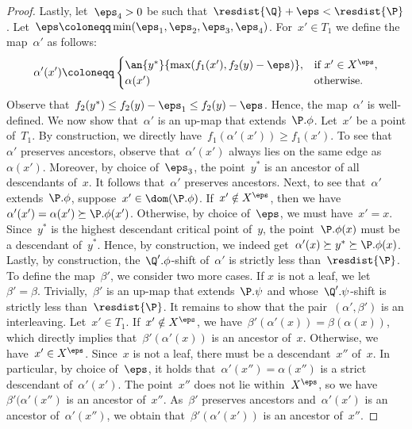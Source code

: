 \begin{proof}
    Lastly, let~$\eps_4 > 0$ be such that~$\resdist{\Q} + \eps < \resdist{\P}$.
    Let~$\eps \coloneqq \min(\eps_1, \eps_2, \eps_3, \eps_4)$.
    For~$x' \in T_1$ we define the map~$\alpha'$ as follows:
    \[
        \alpha'(x') \coloneqq \begin{cases}
            \an{y^*}{\max(f_1(x'), f_2(y)-\eps)}, & \text{if } x' \in X^\eps, \\
            \alpha(x') & \text{otherwise.}
        \end{cases}
    \]
    Observe that~$f_2(y^*) \le f_2(y) - \eps_1 \le f_2(y) - \eps$.
    Hence, the map~$\alpha'$ is well-defined.
    We now show that~$\alpha'$ is an up-map that extends~$\P.\phi$.
%
    Let~$x'$ be a point of~$T_1$.
    By construction, we directly have~$f_1(\alpha'(x')) \ge f_1(x')$.
    To see that~$\alpha'$ preserves ancestors, observe that~$\alpha'(x')$ always lies on the same edge as~$\alpha(x')$.
    Moreover, by choice of~$\eps_3$, the point~$y^*$ is an ancestor of all descendants of~$x$.
    It follows that~$\alpha'$ preserves ancestors.
    Next, to see that~$\alpha'$ extends~$\P.\phi$, suppose~$x' \in \dom(\P.\phi)$.
    If~$x' \notin X^\eps$, then we have~$\alpha'(x') = \alpha(x') \succeq \P.\phi(x')$.
    Otherwise, by choice of~$\eps$, we must have~$x' = x$.
    Since~$y^*$ is the highest descendant critical point of~$y$, the point~$\P.\phi(x)$ must be a descendant of~$y^*$.
    Hence, by construction, we indeed get~$\alpha'(x) \succeq y^* \succeq \P.\phi(x)$.
    Lastly, by construction, the~$\Q'.\phi$-shift of~$\alpha'$ is strictly less than~$\resdist{\P}$. 
%
    To define the map~$\beta'$, we consider two more cases.
%
    If $x$ is not a leaf, we let~$\beta' = \beta$.
    Trivially,~$\beta'$ is an up-map that extends~$\P.\psi$ and whose~$\Q'.\psi$-shift is strictly less than~$\resdist{\P}$.
    It remains to show that the pair~$(\alpha', \beta')$ is an interleaving.
%
    Let~$x' \in T_1$.
    If~$x' \notin X^\eps$, we have~$\beta'(\alpha'(x)) = \beta(\alpha(x))$, which directly implies that~$\beta'(\alpha'(x))$ is an ancestor of~$x$.
    Otherwise, we have~$x' \in X^\eps$.
    Since~$x$ is not a leaf, there must be a descendant~$x''$ of~$x$.
    In particular, by choice of~$\eps$, it holds that~$\alpha'(x'') = \alpha(x'')$ is a strict descendant of~$\alpha'(x')$.
    The point~$x''$ does not lie within~$X^\eps$, so we have~$\beta'(\alpha'(x'')$ is an ancestor of~$x''$.
    As~$\beta'$ preserves ancestors and~$\alpha'(x')$ is an ancestor of~$\alpha'(x'')$, we obtain that~$\beta'(\alpha'(x'))$ is an ancestor of~$x''$.

\end{proof}
